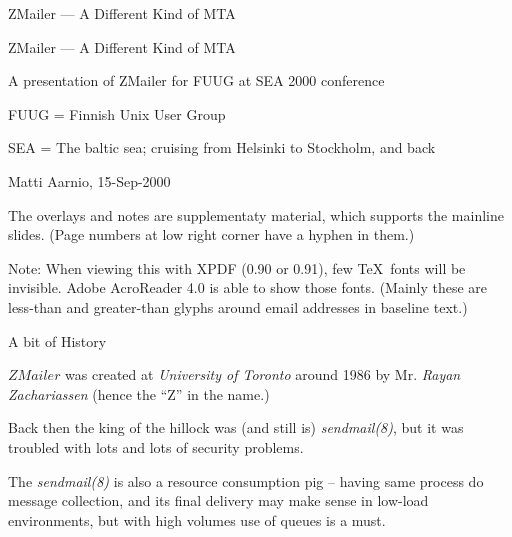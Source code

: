 \documentclass[a4paper,landscape]{slides}
\newcommand{\ZM}{ZMailer}
\begin{document}
\pagestyle{plain}


\begin{slide}

\begin{center}
 ZMailer --- A Different Kind of MTA
\end{center}

\vfill

\begin{center}
\end{center}

\vfill

\end{slide}


\begin{overlay}

\begin{center}
 ZMailer --- A Different Kind of MTA
\end{center}

\vfill

  A presentation of ZMailer for  FUUG at SEA 2000 conference

     FUUG = Finnish Unix User Group

     SEA  = The baltic sea; cruising from Helsinki to Stockholm, and back

 Matti Aarnio, 15-Sep-2000

The overlays and notes are supplementaty material, which supports
the mainline slides.
(Page numbers at low right corner have a hyphen in them.)

\small
Note: When viewing this with XPDF (0.90 or 0.91), few \TeX\ fonts will
be invisible.  Adobe AcroReader 4.0 is able to show those fonts.
(Mainly these are less-than and greater-than glyphs around email
 addresses in baseline text.)

\end{overlay}



\begin{slide}
\centerline{\large A bit of History}

$\ZM$ was created at {\em University of Toronto} around 1986 by
Mr. {\em Rayan Zachariassen} (hence the ``Z'' in the name.)

Back then the king of the hillock was (and still is) {\em sendmail(8)},
but it was troubled with lots and lots of security problems.

The {\em sendmail(8)} is also a resource consumption pig -- having same
process do message collection, and its final delivery may make sense
in low-load environments, but with high volumes use of queues is a must.

\vfill

\end{slide}
\end{document}
